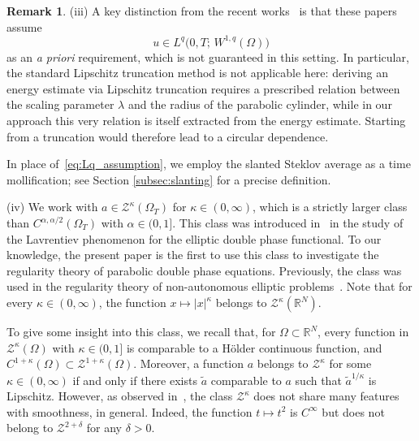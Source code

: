 \documentclass[notitlepage,11pt,reqno]{amsart}
\theoremstyle{definition}
\newtheorem{remark}[theorem]{Remark}
\numberwithin{equation}{section}
\newcommand{\RR}{\mathds{R}}
\begin{document}
\begin{remark}
\textup{(iii)} A key distinction from the recent works~\cite{CGK2025, KO2025}
is that these papers assume
\begin{equation}\label{eq:Lq_assumption}
  u \in L^q\bigl(0, T;\, W^{1,q}(\Omega)\bigr)
\end{equation}
as an {\em a priori} requirement, which is not guaranteed in this setting. In
particular, the standard Lipschitz truncation method is not applicable here:
deriving an energy estimate via Lipschitz truncation requires a prescribed
relation between the scaling parameter $\lambda$ and the radius of the
parabolic cylinder, while in our approach this very relation is itself
extracted from the energy estimate. Starting from a truncation would
therefore lead to a circular dependence.

In place of~\eqref{eq:Lq_assumption}, we employ the slanted Steklov average as a time mollification; see Section \ref{subsec:slanting} for a precise definition.


\textup{(iv)} We work with $a \in \mathcal{Z}^{\kappa}(\Omega_T)$ for
$\kappa \in (0, \infty)$, which is a strictly larger class than
$C^{\alpha, \alpha/2}(\Omega_T)$ with $\alpha \in (0, 1]$. This class was
introduced in~\cite{BCFM2023} in the study of the Lavrentiev phenomenon for
the elliptic double phase functional. To our knowledge, the present paper is
the first to use this class to investigate the regularity theory of parabolic
double phase equations. Previously, the class was used in the regularity
theory of non-autonomous elliptic problems~\cite{HHL_2021, HOK2021, HOK2022}.
Note that for every $\kappa \in (0, \infty)$, the function
$x \mapsto |x|^{\kappa}$ belongs to $\mathcal Z^{\kappa}(\RR^N)$.

To give some insight into this class, we recall that, for
$\Omega \subset \RR^N$, every function in $\mathcal Z^{\kappa}(\Omega)$ with
$\kappa \in (0, 1]$ is comparable to a H\"older continuous function, and
$C^{1+\kappa}(\Omega) \subset \mathcal Z^{1+\kappa}(\Omega)$. Moreover, a function $a$
belongs to $\mathcal Z^{\kappa}$ for some $\kappa \in (0, \infty)$ if and only if there
exists $\tilde{a}$ comparable to $a$ such that $\tilde{a}^{1/\kappa}$ is
Lipschitz. However, as observed in~\cite[Proposition~1.3]{BCFM2023}, the
class $\mathcal Z^{\kappa}$ does not share many features with smoothness, in general.
Indeed, the function $t \mapsto t^2$ is $C^{\infty}$ but does not belong to
$\mathcal Z^{2 + \delta}$ for any $\delta > 0$.
\end{remark}
\end{document}
